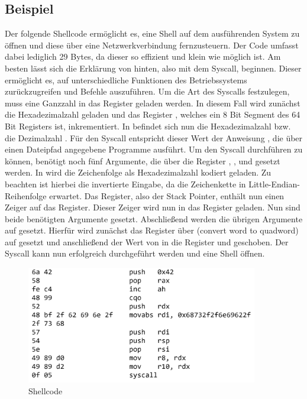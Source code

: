 \subsection{Beispiel}
Der folgende Shellcode ermöglicht es, eine Shell auf dem ausführenden System zu öffnen und diese über eine Netzwerkverbindung fernzusteuern. 
Der Code umfasst dabei lediglich 29 Bytes, da dieser so effizient und klein wie möglich ist. 
Am besten lässt sich die Erklärung von hinten, also mit dem Syscall, beginnen.
Dieser ermöglicht es, auf unterschiedliche Funktionen des Betriebssystems zurückzugreifen und Befehle auszuführen. 
Um die Art des Syscalls festzulegen, muss eine Ganzzahl in das Register  geladen werden. 
In diesem Fall wird zunächst die Hexadezimalzahl  geladen und das Register , 
welches ein 8 Bit Segment des 64 Bit  Registers ist, inkrementiert. 
In  befindet sich nun die Hexadezimalzahl  bzw. die Dezimalzahl . 
Für den Syscall entspricht dieser Wert der Anweisung , 
die über einen Dateipfad angegebene Programme ausführt. Um den Syscall durchführen zu können, benötigt  noch fünf Argumente, 
die über die Register , ,  und  gesetzt werden. 
In  wird die Zeichenfolge  als Hexadezimalzahl kodiert geladen. 
Zu beachten ist hierbei die invertierte Eingabe, da  die Zeichenkette in Little-Endian-Reihenfolge erwartet. Das  Register, 
also der Stack Pointer, 
enthält nun einen Zeiger auf das  Register. Dieser Zeiger wird nun in das  Register geladen. Nun sind beide benötigten Argumente gesetzt. 
Abschließend werden die übrigen Argumente auf  gesetzt. Hierfür wird zunächst das  Register 
über  (convert word to quadword) auf  gesetzt und
anschließend der Wert von  in die Register  und  geschoben. 
Der Syscall kann nun erfolgreich durchgeführt werden und eine Shell öffnen. \cite{syscalls} \cite{execman}
\pagebreak

\begin{figure}[h]
    \centering
    \includegraphics[width=0.9\textwidth,height=0.75\textheight,keepaspectratio]{images/shellstorm.png}
    \caption{Shellcode}
\end{figure}
\cite{shellstorm}

